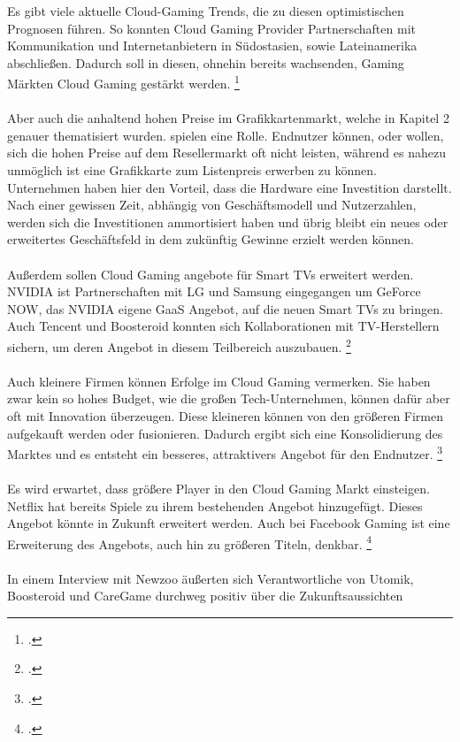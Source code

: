 \documentclass[12pt,toc=bib,toc=listof]{scrreprt}
\begin{document}
Es gibt viele aktuelle Cloud-Gaming Trends, die zu diesen optimistischen Prognosen führen. So konnten Cloud Gaming Provider 
Partnerschaften mit Kommunikation und Internetanbietern in Südostasien, sowie Lateinamerika abschließen. Dadurch soll in diesen, 
ohnehin bereits wachsenden, Gaming Märkten Cloud Gaming gestärkt werden. \footcite [Vgl.] [] {Fernandes.2022}
\\ \\
Aber auch die anhaltend hohen Preise im Grafikkartenmarkt, welche in Kapitel 2 genauer thematisiert wurden.
spielen eine Rolle. Endnutzer können, oder wollen, sich die hohen Preise auf dem Resellermarkt oft nicht leisten, während es nahezu 
unmöglich ist eine Grafikkarte zum Listenpreis erwerben zu können. Unternehmen haben hier den Vorteil, dass die Hardware eine Investition darstellt.
Nach einer gewissen Zeit, abhängig von Geschäftsmodell und Nutzerzahlen, werden sich die Investitionen ammortisiert haben und übrig 
bleibt ein neues oder erweitertes Geschäftsfeld in dem zukünftig Gewinne erzielt werden können.
\\ \\
Außerdem sollen Cloud Gaming angebote für Smart TVs erweitert werden. NVIDIA ist Partnerschaften mit LG und Samsung eingegangen 
um GeForce NOW, das NVIDIA eigene GaaS Angebot, auf die neuen Smart TVs zu bringen. Auch Tencent und Boosteroid konnten sich 
Kollaborationen mit TV-Herstellern sichern, um deren Angebot in diesem Teilbereich auszubauen. \footcite [Vgl.] [] {Fernandes.2022}
\\ \\
Auch kleinere Firmen können Erfolge im Cloud Gaming vermerken. Sie haben zwar kein so hohes Budget, wie die großen Tech-Unternehmen,
können dafür aber oft mit Innovation überzeugen. Diese kleineren können von den größeren Firmen aufgekauft werden oder fusionieren.
Dadurch ergibt sich eine Konsolidierung des Marktes und es entsteht ein besseres, attraktivers Angebot für den Endnutzer. \footcite [Vgl.] [] {Fernandes.2022}
\\ \\
Es wird erwartet, dass größere Player in den Cloud Gaming Markt einsteigen. Netflix hat bereits Spiele zu ihrem bestehenden Angebot
hinzugefügt. Dieses Angebot könnte in Zukunft erweitert werden. Auch bei Facebook Gaming ist eine Erweiterung des Angebots, auch hin zu
größeren Titeln, denkbar. \footcite [Vgl.] [] {Fernandes.2022}
\\ \\
In einem Interview mit Newzoo äußerten sich Verantwortliche von Utomik, Boosteroid und CareGame durchweg positiv über die Zukunftsaussichten
\end{document}
